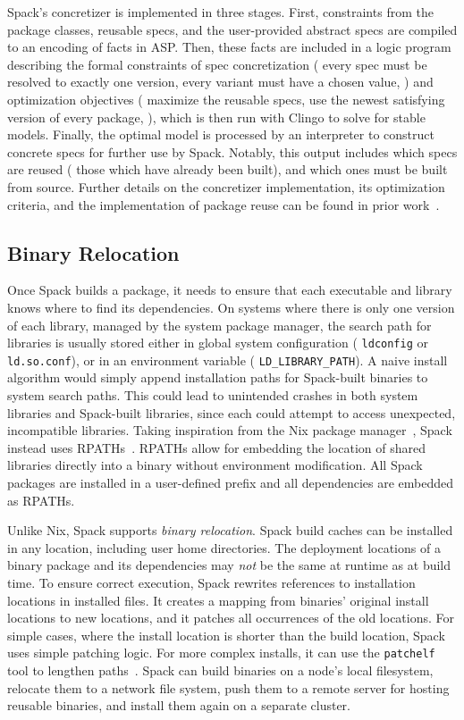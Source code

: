 Spack's concretizer is implemented in three stages. First, constraints from the
package classes, reusable specs, and the user-provided abstract specs are
compiled to an encoding of facts in ASP. Then, these facts are included in a
logic program describing the formal constraints of spec concretization (\eg{}
every spec must be resolved to exactly one version, every variant must have a
chosen value, \etc{}) and optimization objectives (\eg{} maximize the reusable
specs, use the newest satisfying version of every package, \etc{}), which is
then run with Clingo to solve for stable models. Finally, the optimal model
is processed by an interpreter to construct concrete specs for further use by
Spack. Notably, this output includes which specs are reused (\ie{} those which have
already been built), and which ones must be built from source.
%
Further details on the concretizer implementation, its optimization criteria,
and the implementation of package reuse can be found in prior work~\cite{gamblin2022asp}.

%
\subsection{Binary Relocation}
\label{sec:spack-relocation}
Once Spack builds a package, it needs to ensure that each executable and library knows
where to find its dependencies. On systems where there is only one version of each
library, managed by the system package manager, the search path for
libraries is usually stored either in global system configuration (\eg{} {\tt ldconfig} or {\tt
  ld.so.conf}), or in an environment variable (\eg{} \texttt{LD\_LIBRARY\_PATH}). A
naive install algorithm would simply append installation paths for Spack-built binaries
to system search paths. This could lead to unintended crashes in both system
libraries and Spack-built libraries, since each could attempt to access unexpected,
incompatible libraries.
%
Taking inspiration from the Nix package
manager~\cite{dolstra2004nix,dolstra2008nixos},
Spack instead uses RPATHs~\cite{gamblin2015spack}.
RPATHs allow for embedding the location of shared libraries directly into a
binary without environment modification. All
Spack packages are installed in a user-defined prefix and all dependencies are
embedded as RPATHs.

Unlike Nix, Spack supports {\it binary relocation}. Spack build caches can be installed
in any location, including user home directories. The deployment locations of a binary
package and its dependencies may {\it not} be the same at runtime as at build time. To
ensure correct execution, Spack rewrites references to installation locations in
installed files. It creates a mapping from binaries' original
install locations to new locations, and it patches all occurrences of the old locations.
%
For simple cases, where the install location is shorter than the build location, Spack
uses simple patching logic. For more complex installs, it can use the \texttt{patchelf}
tool to lengthen paths~\cite{dolstra-patchelf}.
%
Spack can build binaries on a node's local filesystem,
relocate them to a network file system, push them to a remote server for hosting
reusable binaries, and install them again on a separate cluster.
